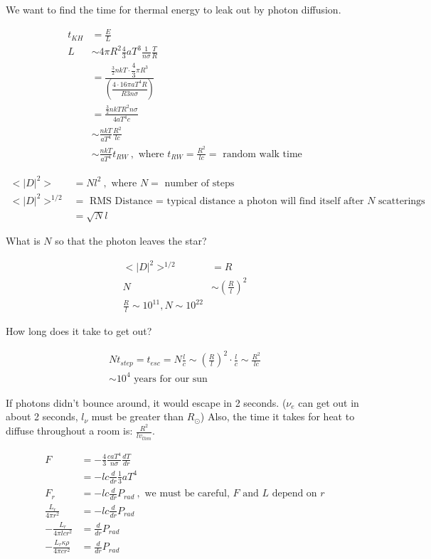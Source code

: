 \documentclass[10pt,letterpaper,final]{book}
\newcommand{\rp}{\right)}
\newcommand{\lp}{\left(}
\begin{document}
We want to find the time for thermal energy to leak out by photon diffusion.

\begin{align}
t_{KH} &= \frac{E}{L}\\
L &\sim 4 \pi R^2 \frac{4}{3}aT^3 \frac{1}{n\sigma}\frac{T}{R}\\
&= \frac{\frac{3}{2}nkT \cdot \dfrac{4}{3}\pi R^3}{ \lp \dfrac{4 \cdot 16 \pi aT^4R}{R3n\sigma} \rp}\\
&=\frac{\frac{3}{2}nkTR^2n\sigma}{4aT^4c}\\
&\sim \frac{nkT}{aT^4}\frac{R^2}{lc}\\
&\sim \frac{nkT}{aT^4}t_{RW}~,\text{ where $t_{RW}=\frac{R^2}{lc}=$ random walk time}
\end{align}

\begin{align}
<|D|^2>&=Nl^2~,\text{ where $N = $ number of steps}\\
<|D|^2>^{1/2} &= \text{ RMS Distance = typical distance a photon will find itself after $N$ scatterings}\\
&= \sqrt{N}l
\end{align}

What is $N$ so that the photon leaves the star?

\begin{align}
<|D|^2>^{1/2} &=R\\
N &\sim \lp \frac{R}{l} \rp^2\\
\frac{R}{l} \sim 10^{11},N\sim 10^{22}
\end{align}

How long does it take to get out? 

\begin{align}
Nt_{step} = t_{esc} = N\frac{l}{c} \sim \lp \frac{R}{l} \rp^2 \cdot \frac{l}{c} \sim \frac{R^2}{lc}\\
\sim 10^4 \text{ years for our sun}
\end{align}

If photons didn't bounce around, it would escape in 2 seconds. ($\nu_e$ can get out in about 2 seconds, $l_\nu$ must be greater than $R_\odot$) Also, the time it takes for heat to diffuse throughout a room is: $\frac{R^2}{lv_{thm}}$.

\begin{align}
F &= -\frac{4}{3}\frac{caT^4}{n \sigma} \frac{dT}{dr}\\
&= -lc \frac{d}{dr}\frac{1}{3}aT^4\\
F_r &= -lc\frac{d}{dr}P_{rad}~,\text{ we must be careful, $F$ and $L$ depend on $r$}\\
\frac{L_r}{4\pi r^2} &= -lc \frac{d}{dr}P_{rad}\\
-\frac{L_r}{4\pi lc r^2} &= \frac{d}{dr}P_{rad}\\
-\frac{L_r \kappa \rho}{4\pi c r^2} &= \frac{d}{dr}P_{rad}\\
\end{align}
\end{document}
